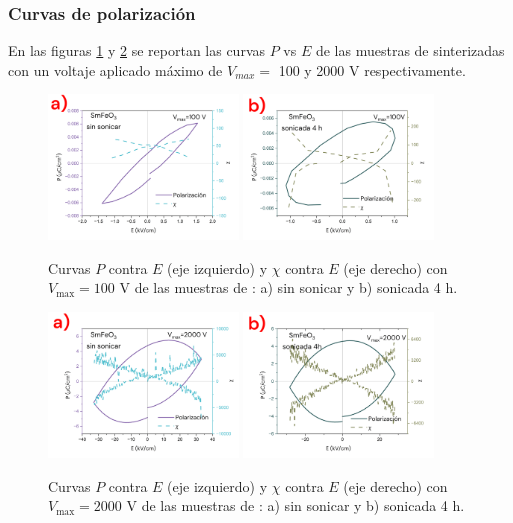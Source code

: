 \documentclass[../main.tex]{subfiles}
\begin{document}
\subsubsection{Curvas de polarización}
En las figuras \ref{fig:sm100v} y \ref{fig:sm2000v} se reportan las curvas $P$ vs $E$ de las muestras de \sama{} sinterizadas con un voltaje aplicado máximo de $V_{max}=$ 100 y 2000 V respectivamente.
\begin{figure}[H]
    \centering
    \includegraphics[width=0.45\textwidth]{fig/PESmFeO3100V.png}
    \quad
    \includegraphics[width=0.45\textwidth]{fig/PESmFeO3-S100V.png}
    \caption{Curvas $P$ contra $E$ (eje izquierdo) y $\chi$ contra $E$ (eje derecho) con $V_\text{max}=100$ V de las muestras de \sama{}: a) sin sonicar y b) sonicada 4 h.}
    \label{fig:sm100v}
\end{figure}
\begin{figure}[H]
    \centering
    \includegraphics[width=0.45\textwidth]{fig/PESmFeO32000V.png}
    \quad
    \includegraphics[width=0.45\textwidth]{fig/PESmFeO3-S2000V.png}
    \caption{Curvas $P$ contra $E$ (eje izquierdo) y $\chi$ contra $E$ (eje derecho) con $V_\text{max}=2000$ V de las muestras de \sama{}: a) sin sonicar y b) sonicada 4 h.}
    \label{fig:sm2000v}
\end{figure}
\end{document}
